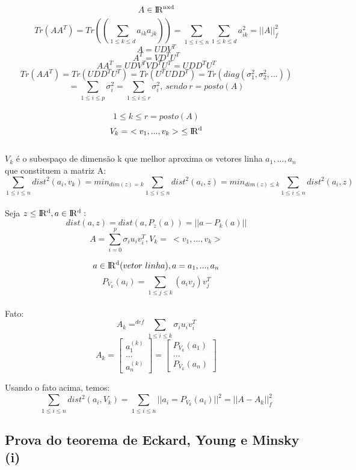 \[A \in  {\rm I\!R^{nxd}}\]
\[ Tr(AA^T) = Tr((\sum_{1\leq k \leq d} a_{ik} a_{jk} )) = \sum_{1 \leq i \leq n} \sum_{1\leq k \leq d} a_{ik}^2 = ||A||_f^2 \]
\[A = UDV^T   \]
\[A^T = VD^T U^T   \]
\[AA^T = UDV^T VD^T U^T = UDD^T U^T  \]
\[Tr(AA^T) = Tr(UDD^T U^T) = Tr(U^T UDD^T) = Tr(diag(\sigma_1^2, \sigma_2^2 , ...))\]
\[= \sum_{1\leq i \leq p} \sigma_i^2 = \sum_{1\leq i \leq r} \sigma_i^2, \ sendo \ r = posto(A) \]\\

\[1\leq k \leq r = posto(A)  \]
\[V_k = \ <v_1,...,v_k> \ \leq {\rm I\!R^d} \]\\
$V_k$ é o subespaço de dimensão k que melhor aproxima os vetores linha $a_1, ... , a_n$ que constituem a matriz A:\\
\[\sum_{1\leq i \leq n} dist^2(a_i,v_k) = min_{dim(z)=k} \sum_{1\leq i \leq n} dist^2(a_i,z) = min_{dim(z)\leq k} \sum_{1\leq i \leq n} dist^2(a_i,z)  \]\\

Seja $z \leq {\rm I\!R^d}, a\in  {\rm I\!R^d}: $ 
\[dist(a,z) = dist(a, P_z(a)) = ||a-P_k(a)|| \]
\[A = \sum_{i=0}^p \sigma_i u_i v_i^T, V_k = \ <v_1,...,v_k>\]

\[ a \in {\rm I\!R^d} (vetor \ linha), a = a_1,...,a_n  \]
\[ P_{V_k}(a_i) = \sum_{1\leq j \leq k}(a_i v_j)v_j^T  \]\\

Fato: \[A_k =^{def} \sum_{1\leq i\leq k}\sigma_i u_i v_i^T\]
\begin{equation*}
A_k =  
\begin{bmatrix}
a_1^{(k)}\\ ...\\a_n^{(k)}
\end{bmatrix} = 
\begin{bmatrix}
P_{V_k}(a_1)\\ ...\\P_{V_k}(a_n)
\end{bmatrix}
\end{equation*}

Usando o fato acima, temos:\\

\[\sum_{1\leq i\leq n} dist^2(a_i,V_k) = \sum_{1\leq i\leq n} ||a_i = P_{V_k}(a_i)||^2 = ||A-A_k||_f^2\]

\subsection{Prova do teorema de Eckard, Young e Minsky (i)}

